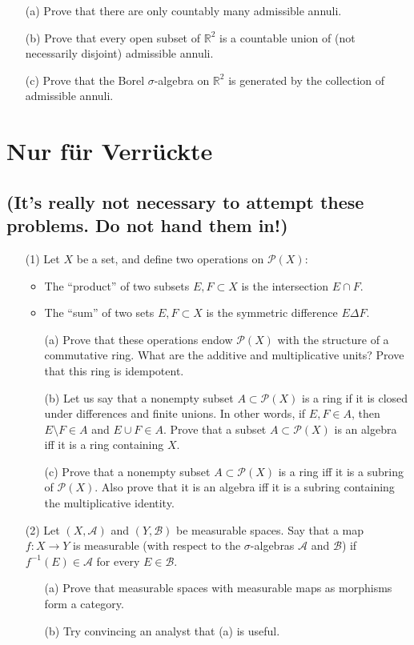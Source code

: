 \documentclass[lang=cn,11pt]{elegantbook}
\begin{document}
\begin{itemize}
    \item[(a)] Prove that there are only countably many admissible annuli.
    \item[(b)] Prove that every open subset of $\mathbb{R}^2$ is a countable union of (not necessarily disjoint) admissible annuli.
    \item[(c)] Prove that the Borel $\sigma$-algebra on $\mathbb{R}^2$ is generated by the collection of admissible annuli.
\end{itemize}

\section{Nur für Verrückte}
\subsection*{(It’s really not necessary to attempt these problems. Do not hand them in!)}

\begin{itemize}
    \item[(1)] Let $X$ be a set, and define two operations on $\mathcal{P}(X)$:
    \begin{itemize}
        \item The “product” of two subsets $E, F \subset X$ is the intersection $E \cap F$.
        \item The “sum” of two sets $E, F \subset X$ is the symmetric difference $E \Delta F$.
    \end{itemize}
    \begin{itemize}
        \item[(a)] Prove that these operations endow $\mathcal{P}(X)$ with the structure of a commutative ring. What are the additive and multiplicative units? Prove that this ring is idempotent.
        \item[(b)] Let us say that a nonempty subset $A \subset \mathcal{P}(X)$ is a ring if it is closed under differences and finite unions. In other words, if $E, F \in A$, then $E \setminus F \in A$ and $E \cup F \in A$. Prove that a subset $A \subset \mathcal{P}(X)$ is an algebra iff it is a ring containing $X$.
        \item[(c)] Prove that a nonempty subset $A \subset \mathcal{P}(X)$ is a ring iff it is a subring of $\mathcal{P}(X)$. Also prove that it is an algebra iff it is a subring containing the multiplicative identity.
    \end{itemize}
    \item[(2)] Let $(X, \mathcal{A})$ and $(Y, \mathcal{B})$ be measurable spaces. Say that a map $f : X \to Y$ is measurable (with respect to the $\sigma$-algebras $\mathcal{A}$ and $\mathcal{B}$) if $f^{-1}(E) \in \mathcal{A}$ for every $E \in \mathcal{B}$.
    \begin{itemize}
        \item[(a)] Prove that measurable spaces with measurable maps as morphisms form a category.
        \item[(b)] Try convincing an analyst that (a) is useful.
    \end{itemize}
\end{itemize}
\end{document}
